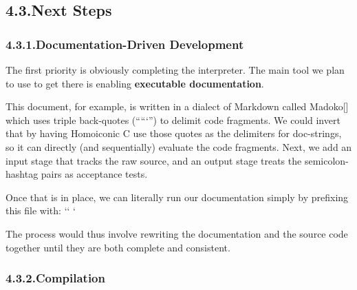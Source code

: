 \documentclass[preprint]{{acmart}}
\begin{document}
\subsection{4.3.\hspace*{0.5em}Next Steps}\label{sec-next-steps}%

\subsubsection{4.3.1.\hspace*{0.5em}Documentation-Driven Development}\label{sec-documentation-driven-development}%

\noindent{}The first priority is obviously completing the interpreter. The main tool
we plan to use to get there is enabling \textbf{executable documentation}.%

This document, for example, is written in a dialect of Markdown called
Madoko[] which uses triple back-quotes (\textquotedblleft{}```\textquotedblright{}) to delimit code
fragments. We could invert that by having Homoiconic C use those quotes
as the delimiters for doc-strings, so it can directly (and sequentially)
evaluate the code fragments. Next, we add an input stage that tracks the
raw source, and an output stage treats the semicolon-hashtag pairs as
acceptance tests.%

Once that is in place, we can literally run our documentation simply by prefixing
this file with:
``
`%

The process would thus involve rewriting the documentation and 
the source code together until they are both complete and consistent.%

\subsubsection{4.3.2.\hspace*{0.5em}Compilation}\label{sec-compilation}%
\end{document}
